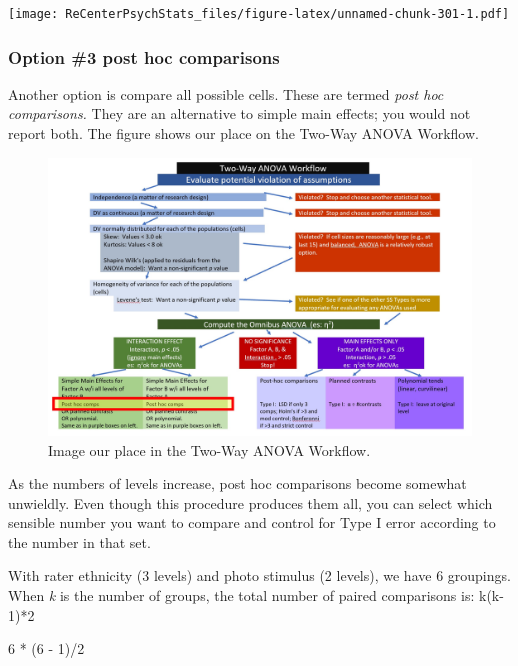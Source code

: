 \documentclass[
  11pt,
]{book}
\newenvironment{Shaded}{\begin{snugshade}}{\end{snugshade}}
\newcommand{\DecValTok}[1]{\textcolor[rgb]{0.00,0.00,0.81}{#1}}
\newcommand{\NormalTok}[1]{#1}
\newcommand{\SpecialCharTok}[1]{\textcolor[rgb]{0.00,0.00,0.00}{#1}}
\begin{document}
\texttt{[image: ReCenterPsychStats\_files/figure-latex/unnamed-chunk-301-1.pdf]}

\hypertarget{option-3-post-hoc-comparisons}{%
\subsubsection{Option \#3 post hoc comparisons}\label{option-3-post-hoc-comparisons}}

Another option is compare all possible cells. These are termed \emph{post hoc comparisons.} They are an alternative to simple main effects; you would not report both. The figure shows our place on the Two-Way ANOVA Workflow.

\begin{figure}
\centering
\includegraphics{images/factorial/WrkFlw_IntPH.jpg}
\caption{Image our place in the Two-Way ANOVA Workflow.}
\end{figure}

As the numbers of levels increase, post hoc comparisons become somewhat unwieldly. Even though this procedure produces them all, you can select which sensible number you want to compare and control for Type I error according to the number in that set.

With rater ethnicity (3 levels) and photo stimulus (2 levels), we have 6 groupings. When \emph{k} is the number of groups, the total number of paired comparisons is: k(k-1)*2

\begin{Shaded}
\begin{Highlighting}[]
\DecValTok{6} \SpecialCharTok{*}\NormalTok{ (}\DecValTok{6} \SpecialCharTok{{-}} \DecValTok{1}\NormalTok{)}\SpecialCharTok{/}\DecValTok{2}
\end{Highlighting}
\end{Shaded}
\end{document}

